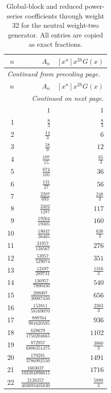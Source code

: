 \begingroup\small
\setlength{\tabcolsep}{5pt}
\begin{longtable}{rrr}
\caption{Global-block and reduced power-series coefficients through weight 32 for the neutral weight-two generator. All entries are copied as exact fractions.}\label{expphysics:blocks-u_neutral}\\
\toprule
$n$ & $A_n$ & $[x^n]x^{2h}G(x)$\\
\midrule
\endfirsthead
\multicolumn{3}{l}{\small\itshape Continued from preceding page.}\\
\toprule
$n$ & $A_n$ & $[x^n]x^{2h}G(x)$\\
\midrule
\endhead
\midrule
\multicolumn{3}{r}{\small\itshape Continued on next page.}\\
\endfoot
\bottomrule
\endlastfoot
0 & $1$ & $1$\\
1 & $\frac{8}{3}$ & $\frac{8}{3}$\\
2 & $\frac{14}{3}$ & $6$\\
3 & $\frac{58}{9}$ & $12$\\
4 & $\frac{107}{15}$ & $\frac{65}{3}$\\
5 & $\frac{674}{105}$ & $36$\\
6 & $\frac{131}{27}$ & $56$\\
7 & $\frac{2207}{693}$ & $\frac{248}{3}$\\
8 & $\frac{2402}{1287}$ & $117$\\
9 & $\frac{19264}{19305}$ & $160$\\
10 & $\frac{18047}{36465}$ & $\frac{638}{3}$\\
11 & $\frac{31957}{138567}$ & $276$\\
12 & $\frac{53957}{529074}$ & $351$\\
13 & $\frac{12497}{289731}$ & $\frac{1316}{3}$\\
14 & $\frac{136957}{7800450}$ & $540$\\
15 & $\frac{208007}{30087450}$ & $656$\\
16 & $\frac{153811}{58169070}$ & $\frac{2363}{3}$\\
17 & $\frac{888764}{901620585}$ & $936$\\
18 & $\frac{628679}{1750204665}$ & $1102$\\
19 & $\frac{872957}{6806351475}$ & $\frac{3860}{3}$\\
20 & $\frac{170281}{3786992550}$ & $1491$\\
21 & $\frac{1603037}{103384896615}$ & $1716$\\
22 & $\frac{2126357}{403693405830}$ & $\frac{5888}{3}$\\

\end{longtable}
